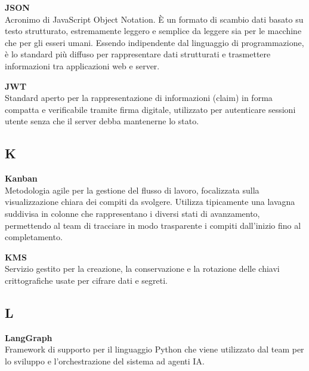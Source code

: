\documentclass[12pt, a4paper]{article}
\begin{document}
\noindent\hypertarget{json}{\textbf{JSON}} \\[0.1em]
Acronimo di JavaScript Object Notation. È un formato di scambio dati basato su testo strutturato, estremamente leggero e semplice da leggere sia per le macchine che per gli esseri umani. Essendo indipendente dal linguaggio di programmazione, è lo standard più diffuso per rappresentare dati strutturati e trasmettere informazioni tra applicazioni web e server.
\vspace{0.5cm}

\noindent\hypertarget{jwt}{\textbf{JWT}} \\[0.1em]
Standard aperto per la rappresentazione di informazioni (claim) in forma compatta e verificabile tramite firma digitale, utilizzato per autenticare sessioni utente senza che il server debba mantenerne lo stato.
\vspace{0.1cm}

\newpage
\subsection*{K}
{}
\vspace{0.2cm}

\noindent\hypertarget{kanban}{\textbf{Kanban}} \\[0.1em]
Metodologia agile per la gestione del flusso di lavoro, focalizzata sulla visualizzazione chiara dei compiti da svolgere. Utilizza tipicamente una lavagna suddivisa in colonne che rappresentano i diversi stati di avanzamento, permettendo al team di tracciare in modo trasparente i compiti dall'inizio fino al completamento.
\vspace{0.5cm}

\noindent\hypertarget{kms}{\textbf{KMS}} \\[0.1em]
Servizio gestito per la creazione, la conservazione e la rotazione delle chiavi crittografiche usate per cifrare dati e segreti.
\vspace{0.1cm}

\newpage
\subsection*{L}
{}
\vspace{0.2cm}

\noindent\hypertarget{langgraph}{\textbf{LangGraph}} \\[0.1em]
Framework di supporto per il linguaggio Python che viene utilizzato dal team per lo sviluppo e l'orchestrazione del sistema ad agenti IA.
\vspace{0.5cm}  
\end{document}
